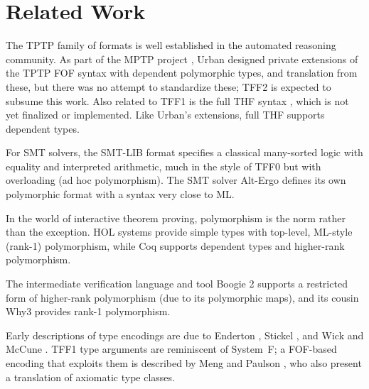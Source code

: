 \section{Related Work}
\label{sec_related}

The TPTP family of formats is well established in the automated reasoning
community. As part of the MPTP project \cite{urban-2006}, Urban designed private
extensions of the TPTP FOF syntax with dependent polymorphic types, and
translation from these, but there was no attempt to standardize these; TFF2 is
expected to subsume this work. Also related to TFF1 is the full THF syntax
\cite{sutcliffe-benzmueller-2010}, which is not yet finalized or implemented.
Like Urban's extensions, full THF supports dependent types.

For SMT solvers, the SMT-LIB format \cite{barrett-et-al-2010}
specifies a classical many-sorted logic with equality and interpreted
arithmetic, much in the style of TFF0 but with overloading (ad hoc
polymorphism). The SMT solver Alt-Ergo \cite{bobot-et-al-2008} defines its own
polymorphic format with a syntax very close to ML.

In the world of interactive theorem proving, polymorphism is the norm rather
than the exception. HOL systems \cite{gordon-melham-1993} provide simple types
with top-level, ML-style (rank-1) polymorphism, while Coq
\cite{bertot-casteran-2004} supports dependent types and higher-rank
polymorphism.

The intermediate verification language and tool Boogie 2 \cite{leino-ruemmer-2010}
supports a restricted form of higher-rank polymorphism (due to its polymorphic maps),
and its cousin Why3 \cite{bobot-et-al-2011}
provides rank-1 polymorphism.%

Early descriptions of type encodings are due to Enderton
\cite[\S4.3]{enderton-1972}, Stickel \cite[p.~99]{stickel-1986}, and Wick and
McCune \cite[\S4]{wick-mccune-1989}. TFF1 type arguments are reminiscent of
System~F; a FOF-based encoding that exploits them is described by Meng and
Paulson \cite{meng-paulson-2008-trans}, who also present a translation of
axiomatic type classes.

